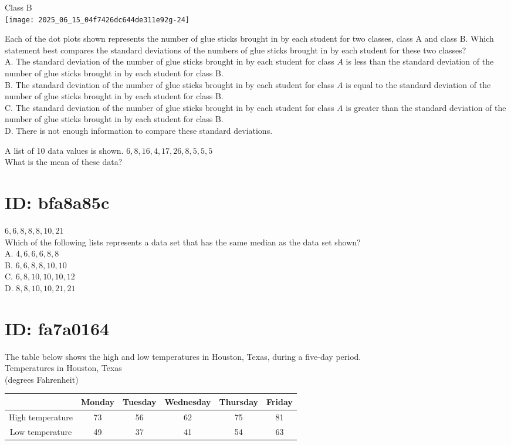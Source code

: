 Class B\\
\texttt{[image: 2025\_06\_15\_04f7426dc644de311e92g-24]}

Each of the dot plots shown represents the number of glue sticks brought in by each student for two classes, class A and class B. Which statement best compares the standard deviations of the numbers of glue sticks brought in by each student for these two classes?\\
A. The standard deviation of the number of glue sticks brought in by each student for class $A$ is less than the standard deviation of the number of glue sticks brought in by each student for class B.\\
B. The standard deviation of the number of glue sticks brought in by each student for class $A$ is equal to the standard deviation of the number of glue sticks brought in by each student for class B.\\
C. The standard deviation of the number of glue sticks brought in by each student for class $A$ is greater than the standard deviation of the number of glue sticks brought in by each student for class B.\\
D. There is not enough information to compare these standard deviations.

A list of 10 data values is shown. $6,8,16,4,17,26,8,5,5,5$\\
What is the mean of these data?

\section*{ID: bfa8a85c}
$6,6,8,8,8,10,21$\\
Which of the following lists represents a data set that has the same median as the data set shown?\\
A. $4,6,6,6,8,8$\\
B. $6,6,8,8,10,10$\\
C. $6,8,10,10,10,12$\\
D. $8,8,10,10,21,21$

\section*{ID: fa7a0164}
The table below shows the high and low temperatures in Houston, Texas, during a five-day period.\\
Temperatures in Houston, Texas\\
(degrees Fahrenheit)

\begin{center}
\begin{tabular}{|c|c|c|c|c|c|}
\cline { 2 - 6 }
\multicolumn{1}{c|}{} & Monday & Tuesday & Wednesday & Thursday & Friday \\
\hline
High temperature & 73 & 56 & 62 & 75 & 81 \\
\hline
Low temperature & 49 & 37 & 41 & 54 & 63 \\
\hline
\end{tabular}
\end{center}


